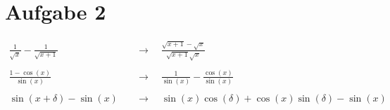 \section{Aufgabe 2} \label{sec:A2}

\begin{align*}
    \frac{1}{\sqrt{x}} - \frac{1}{\sqrt{x+1}}
        &\quad\longrightarrow\quad
    \frac{\sqrt{x + 1} - \sqrt{x}}{\sqrt{x + 1} \sqrt{x}} \\
    \\
    \frac{1 - \cos(x)}{\sin(x)}
        &\quad\longrightarrow\quad
    \frac{1}{\sin(x)} - \frac{\cos(x)}{\sin(x)} \\
    \\
    \sin(x + \delta) - \sin(x)
        &\quad\longrightarrow\quad
    \sin(x) \cos(\delta) + \cos(x) \sin(\delta) - \sin(x) \\
\end{align*}

